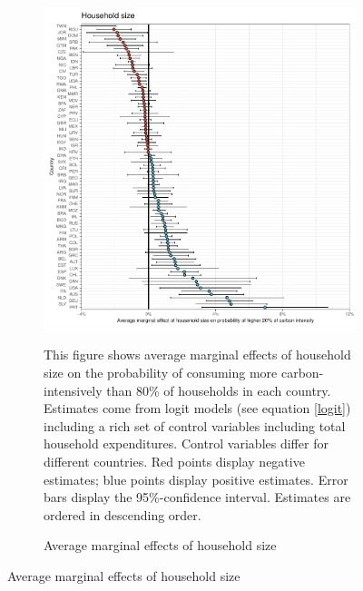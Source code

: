  \begin{figure}[ht!]\ContinuedFloat
   \centering
   \begin{subfigure}[b]{\textwidth}
   \centering
   \includegraphics{1_Figures/Analysis_Logit_Models_Marginal_Effects/Average_Marginal_Effects_affected_upper_80_hh_size_2017B.pdf}
   \caption{Average marginal effects of household size} \label{fig:Logit_ME_size}
   \begin{subcaption2}
     This figure shows average marginal effects of household size on the probability of consuming more carbon-intensively than 80\% of households in each country. Estimates come from logit models (see equation \ref{logit}) including a rich set of control variables including total household expenditures. Control variables differ for different countries. Red points display negative estimates; blue points display positive estimates. Error bars display the 95\%-confidence interval. Estimates are ordered in descending order.
   \end{subcaption2}
   \end{subfigure}
 \end{figure}
 \clearpage

